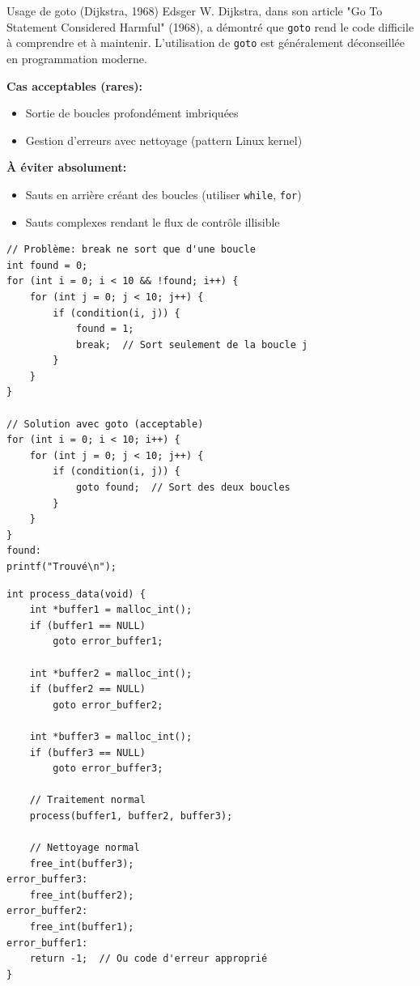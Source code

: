 \documentclass[10pt,a4paper]{article}
\begin{document}
\begin{warningbox}{Usage de goto (Dijkstra, 1968)}
Edsger W. Dijkstra, dans son article "Go To Statement Considered Harmful" (1968), a démontré que \texttt{goto} rend le code difficile à comprendre et à maintenir. L'utilisation de \texttt{goto} est généralement déconseillée en programmation moderne.

\textbf{Cas acceptables (rares):}
\begin{itemize}
\item Sortie de boucles profondément imbriquées
\item Gestion d'erreurs avec nettoyage (pattern Linux kernel)
\end{itemize}

\textbf{À éviter absolument:}
\begin{itemize}
\item Sauts en arrière créant des boucles (utiliser \texttt{while}, \texttt{for})
\item Sauts complexes rendant le flux de contrôle illisible
\end{itemize}
\end{warningbox}

\begin{lstlisting}[caption={Goto: sortie de boucles imbriquées}]
// Problème: break ne sort que d'une boucle
int found = 0;
for (int i = 0; i < 10 && !found; i++) {
    for (int j = 0; j < 10; j++) {
        if (condition(i, j)) {
            found = 1;
            break;  // Sort seulement de la boucle j
        }
    }
}

// Solution avec goto (acceptable)
for (int i = 0; i < 10; i++) {
    for (int j = 0; j < 10; j++) {
        if (condition(i, j)) {
            goto found;  // Sort des deux boucles
        }
    }
}
found:
printf("Trouvé\n");
\end{lstlisting}

\begin{lstlisting}[caption={Goto: gestion d'erreurs (pattern kernel)}]
int process_data(void) {
    int *buffer1 = malloc_int();
    if (buffer1 == NULL)
        goto error_buffer1;
    
    int *buffer2 = malloc_int();
    if (buffer2 == NULL)
        goto error_buffer2;
    
    int *buffer3 = malloc_int();
    if (buffer3 == NULL)
        goto error_buffer3;
    
    // Traitement normal
    process(buffer1, buffer2, buffer3);
    
    // Nettoyage normal
    free_int(buffer3);
error_buffer3:
    free_int(buffer2);
error_buffer2:
    free_int(buffer1);
error_buffer1:
    return -1;  // Ou code d'erreur approprié
}
\end{lstlisting}
\end{document}
